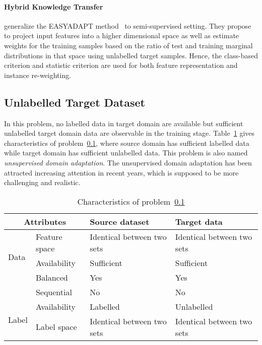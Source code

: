 \documentclass[prodmode]{acmsmall}  %
\begin{document}
\paragraph{Hybrid Knowledge Transfer}
 generalize the EASYADAPT method~\cite{DaumeIII2007} to semi-supervised setting. They propose to project input features into a higher dimensional space as well as estimate weights for the training samples based on the ratio of test and training marginal distributions in that space using unlabelled target samples. Hence, the class-based criterion and statistic criterion are used for both feature representation and instance re-weighting.
\subsection{Unlabelled Target Dataset}
\label{sec:HOMOunsup}
In this problem, no labelled data in target domain are available but sufficient unlabelled target domain data are observable in the training stage.
Table~\ref{tab:HOMOunsup} gives characteristics of problem~\ref{sec:HOMOunsup}, where source domain has sufficient labelled data while target domain has sufficient unlabelled data. This problem is also named \textit{unsupervised domain adaptation}. The unsupervised domain adaptation has been attracted increasing attention in recent years, which is supposed to be more challenging and realistic.
\begin{table}[htbp!]
\caption{Characteristics of problem~\ref{sec:HOMOunsup}}
\label{tab:HOMOunsup}
\begin{center}
\begin{small}
\begin{tabular}{|p{1cm}<{\centering}|m{2.5cm}<{\centering}|m{4.3cm}<{\centering}|m{4.3cm}<{\centering}|}
\hline
\multicolumn{2}{|c|}{Attributes} & Source dataset & Target data \\
\hline \hline
\multirow{3}{*}{Data} & Feature space & Identical between two sets & Identical between two sets \\ 
\cline{2-4}{} & Availability & Sufficient & Sufficient  \\
\cline{2-4}{} & Balanced & Yes & Yes \\
\cline{2-4}{} & Sequential & No & No \\
\hline \hline
\multirow{2}{*}{Label} & Availability & Labelled & {\color{red}Unlabelled}\\
\cline{2-4}{}  & Label space & Identical between two sets & Identical between two sets \\ 
\hline
\end{tabular}
\end{small}
\end{center}
\end{table}
\end{document}
